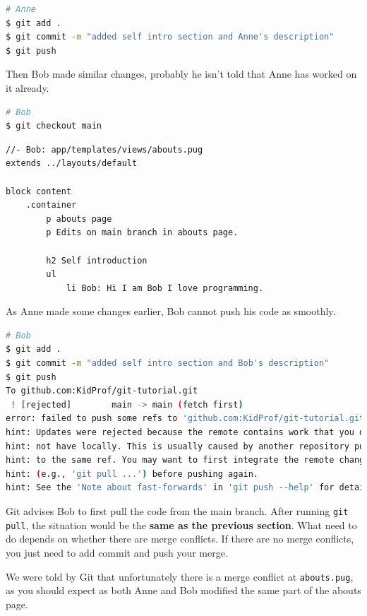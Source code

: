 \begin{lstlisting}[language=bash]
# Anne
$ git add .
$ git commit -m "added self intro section and Anne's description"
$ git push
\end{lstlisting}
\vspace{6mm}

Then Bob made similar changes, probably he isn't told that Anne has worked on it already.
\vspace{6mm}

\begin{lstlisting}[language=bash]
# Bob
$ git checkout main
\end{lstlisting}

\begin{lstlisting}[language=pug]
//- Bob: app/templates/views/abouts.pug
extends ../layouts/default

block content
	.container
		p abouts page
		p Edits on main branch in abouts page.

		h2 Self introduction
		ul
			li Bob: Hi I am Bob I love programming.
\end{lstlisting}

As Anne made some changes earlier, Bob cannot push his code as smoothly.

\begin{lstlisting}[language=bash]
# Bob
$ git add .
$ git commit -m "added self intro section and Bob's description"
$ git push
To github.com:KidProf/git-tutorial.git
 ! [rejected]        main -> main (fetch first)
error: failed to push some refs to 'github.com:KidProf/git-tutorial.git'
hint: Updates were rejected because the remote contains work that you do
hint: not have locally. This is usually caused by another repository pushing
hint: to the same ref. You may want to first integrate the remote changes
hint: (e.g., 'git pull ...') before pushing again.
hint: See the 'Note about fast-forwards' in 'git push --help' for detail
\end{lstlisting}

Git advises Bob to first pull the code from the main branch. After running \texttt{git pull}, the situation would be the \textbf{same as the previous section}. What need to do depends on whether there are merge conflicts. If there are no merge conflicts, you just need to add commit and push your merge.

We were told by Git that unfortunately there is a merge conflict at \texttt{abouts.pug}, as you should expect as both Anne and Bob modified the same part of the abouts page.

